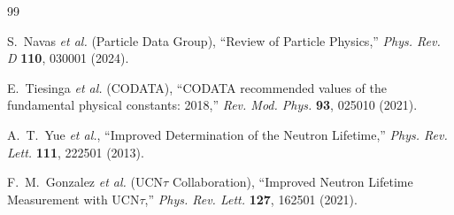\documentclass[12pt,a4paper]{article}
\begin{document}
\begin{thebibliography}{99}

S.~Navas \textit{et al.} (Particle Data Group), ``Review of Particle Physics,'' \textit{Phys. Rev. D} \textbf{110}, 030001 (2024).

E.~Tiesinga \textit{et al.} (CODATA), ``CODATA recommended values of the fundamental physical constants: 2018,'' \textit{Rev. Mod. Phys.} \textbf{93}, 025010 (2021).

A.~T.~Yue \textit{et al.}, ``Improved Determination of the Neutron Lifetime,'' \textit{Phys. Rev. Lett.} \textbf{111}, 222501 (2013).

F.~M.~Gonzalez \textit{et al.} (UCN$\tau$ Collaboration), ``Improved Neutron Lifetime Measurement with UCN$\tau$,'' \textit{Phys. Rev. Lett.} \textbf{127}, 162501 (2021).

\end{thebibliography}	
\end{document}
